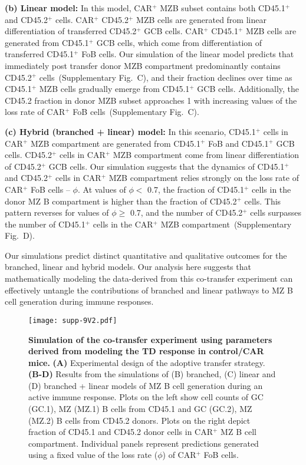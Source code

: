 \documentclass[11pt]{article}
\newcommand{\red}[1]{{\color{red}{#1}}}
\begin{document}
\textbf{(b) Linear model:}
In this model, CAR$^{+}$ MZB subset contains both CD45.1$^{+}$ and CD45.2$^{+}$ cells.
CAR$^{+}$ CD45.2$^{+}$ MZB cells are generated from linear differentiation of transferred CD45.2$^{+}$ GCB cells.
CAR$^{+}$ CD45.1$^{+}$ MZB cells are generated from CD45.1$^{+}$ GCB cells, which come from differentiation of transferred CD45.1$^{+}$ FoB cells.
Our simulation of the linear model predicts that immediately post transfer donor MZB compartment predominantly contains CD45.2$^{+}$ cells~(Supplementary Fig.~\red{XX}C), and their fraction declines over time as CD45.1$^{+}$ MZB cells gradually emerge from CD45.1$^{+}$ GCB cells. 
Additionally, the CD45.2 fraction in donor MZB subset approaches 1 with increasing values of the loss rate of CAR$^{+}$ FoB cells~(Supplementary Fig.~\red{XX}C). 


\textbf{(c) Hybrid (branched + linear) model:}
In this scenario, CD45.1$^{+}$ cells in CAR$^{+}$ MZB compartment are generated from CD45.1$^{+}$ FoB and CD45.1$^{+}$ GCB cells.  %
CD45.2$^{+}$ cells in CAR$^{+}$  MZB compartment come from linear differentiation of CD45.2$^{+}$ GCB cells.
Our simulation suggests that the dynamics of CD45.1$^{+}$ and CD45.2$^{+}$ cells in CAR$^{+}$ MZB compartment relies strongly on the loss rate of CAR$^{+}$ FoB cells --  $\phi$.
At values of $\phi <$ 0.7, the fraction of CD45.1$^{+}$ cells in the donor MZ B compartment is higher than the fraction of CD45.2$^{+}$ cells.
This pattern reverses for values of $\phi \ge$ 0.7, and the number of CD45.2$^{+}$ cells surpasses the number of  CD45.1$^{+}$ cells in the CAR$^{+}$  MZB compartment~(Supplementary Fig.~\red{XX}D).

Our simulations predict distinct quantitative and qualitative outcomes for the branched, linear and hybrid models.
Our analysis here suggests that mathematically modeling the data-derived from this co-transfer experiment can effectively untangle the contributions of branched and linear pathways to MZ B cell generation during immune responses.

 
 
\clearpage


\begin{figure}[htbp]
\center
\texttt{[image: supp-9V2.pdf]}
\caption{
    \textbf{Simulation of the co-transfer experiment using parameters derived from modeling the TD response in control/CAR mice.}
    \textbf{(A)} Experimental design of the adoptive transfer strategy.
    \textbf{(B-D)} Results from the simulations of (B) branched, (C) linear and (D) branched + linear models of MZ B cell generation during an active immune response.
    Plots on the left  show cell counts of GC (GC.1), MZ (MZ.1) B cells from CD45.1 and GC (GC.2), MZ (MZ.2) B cells from CD45.2 donors.
    Plots on the right depict fraction of CD45.1 and CD45.2 donor cells in CAR$^+$ MZ B cell compartment.
    Individual panels represent predictions generated using a fixed value of the loss rate ($\phi$) of CAR$^{+}$ FoB cells.
    }
    \label{fig:co-transf}
 \end{figure}
 
 
\end{document}

